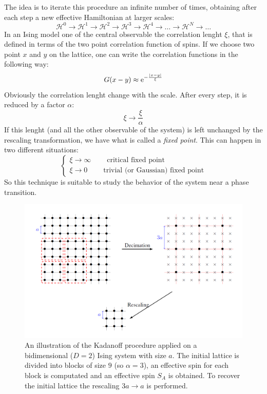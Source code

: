 The idea is to iterate this procedure an infinite number of times, obtaining after each step a new effective Hamiltonian 
at larger scales:
$$\mathcal{H}^{0}\to\mathcal{H}^{1}\to\mathcal{H}^{2}\to\mathcal{H}^{3}\to\mathcal{H}^{4}\to\dots \to\mathcal{H}^{N}\to\dots $$
In an Ising model one of the central observable the correlation lenght $\xi$, that  is defined in terms  of the two point correlation function of spins.
If we choose two point $x$ and $y$ on the lattice, one can write the correlation functions in  the following way:
\begin{equation}
 G(x-y) \approx \operatorname{e}^{-\frac{|x-y|}{\xi}}
\end{equation}
Obviously the correlation lenght change with the scale. After every step, it is reduced by a factor $\alpha$:
$$\xi \to \frac{\xi}{\alpha}$$
If this lenght (and all the other observable of the system) is left unchanged by the rescaling transformation, 
we have what is called a \emph{fixed point}. This can happen in two different situations:
\begin{equation}
\left\{
\begin{array}{l}
\xi \to \infty \ \ \ \ \ \  \ \ \ \ \text{critical fixed point}\\
\xi \to 0 \ \ \ \ \ \  \ \ \ \ \text{trivial (or Gaussian) fixed point}
\end{array}
\right.
\end{equation}
So this technique is suitable to study the behavior of the system near a phase transition.
\begin{figure}
\begin{center}
\includegraphics[scale=0.38]{Immagini/kadanoff.png}
\caption{An illustration of the Kadanoff procedure applied on a bidimensional ($D=2$) Ising system with size $a$.
The initial lattice is divided into blocks of size $9$ (so $\alpha = 3$), an effective spin for each block is computated
and an effective spin $S_A$ is obtained. To recover the initial lattice the rescaling $3a\to a$ is performed. \cite{karim}}
\label{fig:ising}
\end{center}
\end{figure}

